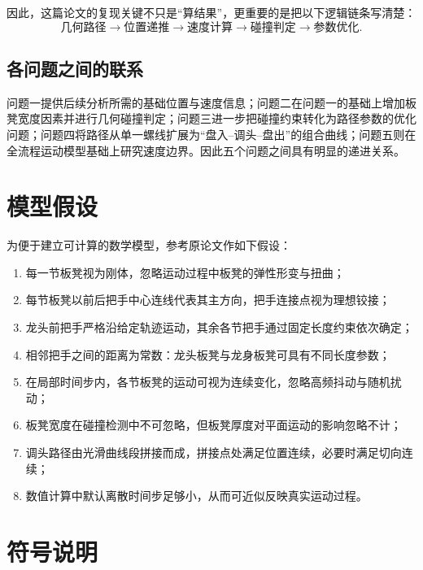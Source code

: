 \documentclass[12pt,a4paper]{ctexart}
\begin{document}
因此，这篇论文的复现关键不只是“算结果”，更重要的是把以下逻辑链条写清楚：
\[
\text{几何路径} \longrightarrow \text{位置递推} \longrightarrow \text{速度计算}
\longrightarrow \text{碰撞判定} \longrightarrow \text{参数优化}.
\]

\subsection{各问题之间的联系}
问题一提供后续分析所需的基础位置与速度信息；问题二在问题一的基础上增加板凳宽度因素并进行几何碰撞判定；问题三进一步把碰撞约束转化为路径参数的优化问题；问题四将路径从单一螺线扩展为“盘入--调头--盘出”的组合曲线；问题五则在全流程运动模型基础上研究速度边界。因此五个问题之间具有明显的递进关系。

\section{模型假设}

为便于建立可计算的数学模型，参考原论文作如下假设：

\begin{enumerate}[label=\textbf{H\arabic*},leftmargin=2.5em]
    \item 每一节板凳视为刚体，忽略运动过程中板凳的弹性形变与扭曲；
    \item 每节板凳以前后把手中心连线代表其主方向，把手连接点视为理想铰接；
    \item 龙头前把手严格沿给定轨迹运动，其余各节把手通过固定长度约束依次确定；
    \item 相邻把手之间的距离为常数：龙头板凳与龙身板凳可具有不同长度参数；
    \item 在局部时间步内，各节板凳的运动可视为连续变化，忽略高频抖动与随机扰动；
    \item 板凳宽度在碰撞检测中不可忽略，但板凳厚度对平面运动的影响忽略不计；
    \item 调头路径由光滑曲线段拼接而成，拼接点处满足位置连续，必要时满足切向连续；
    \item 数值计算中默认离散时间步足够小，从而可近似反映真实运动过程。
\end{enumerate}

\section{符号说明}
\end{document}
